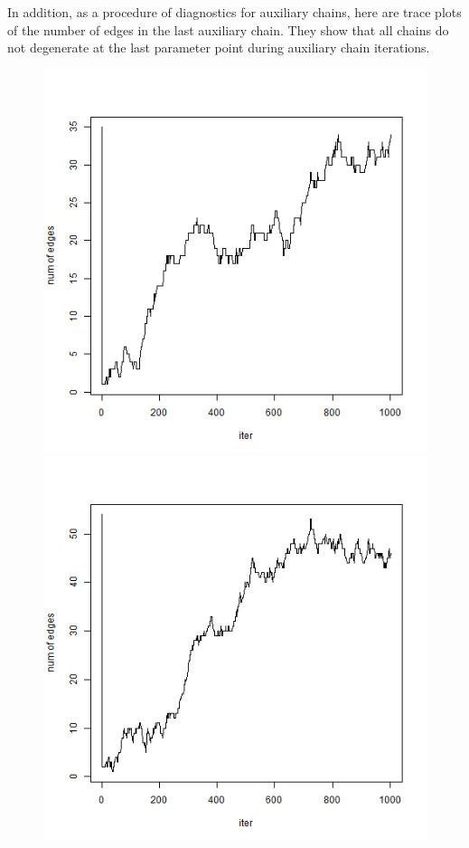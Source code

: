 \documentclass[a4paper, 11pt]{report}
\theoremstyle{definition}
\begin{document}
In addition, as a procedure of diagnostics for auxiliary chains,
here are trace plots of the number of edges in the last auxiliary chain.
They show that all chains do not degenerate at the last parameter point during auxiliary chain iterations.

\begin{figure}[h]
    \begin{center}
        \includegraphics[scale=0.26]{pictures/net1seq_chain1_lastsampler_num_edges.png}
        \includegraphics[scale=0.26]{pictures/net2seq_chain1_lastsampler_num_edges.png}

\end{center}
\end{figure}
\end{document}
